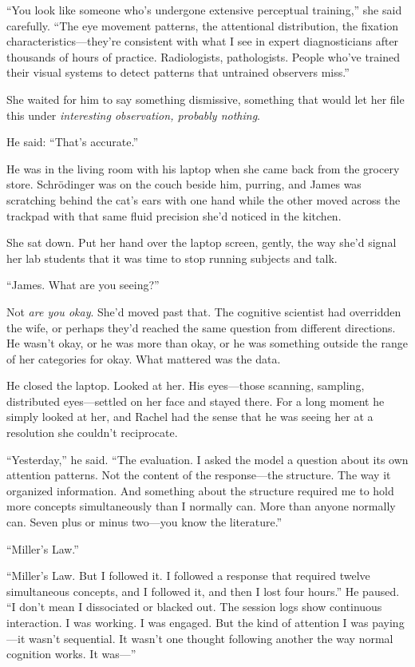 ``You look like someone who's undergone extensive perceptual training,'' she said carefully. ``The eye movement patterns, the attentional distribution, the fixation characteristics---they're consistent with what I see in expert diagnosticians after thousands of hours of practice. Radiologists, pathologists. People who've trained their visual systems to detect patterns that untrained observers miss.''

She waited for him to say something dismissive, something that would let her file this under \textit{interesting observation, probably nothing}.

He said: ``That's accurate.''

\bigskip

He was in the living room with his laptop when she came back from the grocery store. Schr\"{o}dinger was on the couch beside him, purring, and James was scratching behind the cat's ears with one hand while the other moved across the trackpad with that same fluid precision she'd noticed in the kitchen.

She sat down. Put her hand over the laptop screen, gently, the way she'd signal her lab students that it was time to stop running subjects and talk.

``James. What are you seeing?''

Not \textit{are you okay}. She'd moved past that. The cognitive scientist had overridden the wife, or perhaps they'd reached the same question from different directions. He wasn't okay, or he was more than okay, or he was something outside the range of her categories for okay. What mattered was the data.

He closed the laptop. Looked at her. His eyes---those scanning, sampling, distributed eyes---settled on her face and stayed there. For a long moment he simply looked at her, and Rachel had the sense that he was seeing her at a resolution she couldn't reciprocate.

``Yesterday,'' he said. ``The evaluation. I asked the model a question about its own attention patterns. Not the content of the response---the structure. The way it organized information. And something about the structure required me to hold more concepts simultaneously than I normally can. More than anyone normally can. Seven plus or minus two---you know the literature.''

``Miller's Law.''

``Miller's Law. But I followed it. I followed a response that required twelve simultaneous concepts, and I followed it, and then I lost four hours.'' He paused. ``I don't mean I dissociated or blacked out. The session logs show continuous interaction. I was working. I was engaged. But the kind of attention I was paying---it wasn't sequential. It wasn't one thought following another the way normal cognition works. It was---''

